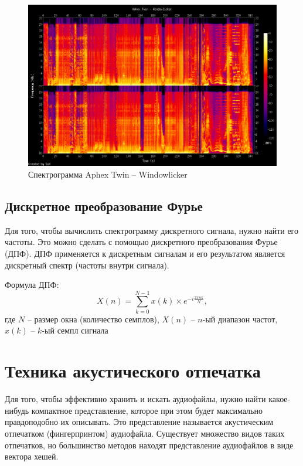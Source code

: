 \begin{figure}[H]
    \begin{center}
        \includegraphics[scale=0.4]{inc/img/windowlicker.png}
        \caption{Спектрограмма Aphex Twin -- Windowlicker}
    \end{center}
\end{figure}

\subsection{Дискретное преобразование Фурье}
Для того, чтобы вычислить спектрограмму дискретного сигнала, нужно найти
его частоты. Это можно сделать с помощью дискретного преобразования Фурье (ДПФ).
ДПФ применяется к дискретным сигналам и его результатом является дискретный спектр (частоты внутри сигнала).

Формула ДПФ:
\begin{equation}
X(n) = \sum_{k=0}^{N-1} x(k) \times e^{-i \frac{2 \pi n k}{N}},
\end{equation}
где $N$ -- размер окна (количество семплов),
$X(n)$ -- $n$-ый диапазон частот,
$x(k)$ -- $k$-ый семпл сигнала

\section{Техника акустического отпечатка}
Для того, чтобы эффективно хранить и искать аудиофайлы, нужно
найти какое-нибудь компактное представление, которое при этом будет
максимально правдоподобно их описывать.
Это представление называется акустическим отпечатком (фингерпринтом) аудиофайла.
Существует множество видов таких отпечатков, но большинство методов
находят представление аудиофайлов в виде вектора хешей.

